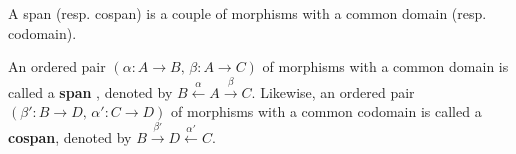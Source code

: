 A span (resp. cospan) is a couple of morphisms with a common domain (resp. codomain).
\begin{definition}
An ordered pair \((\alpha : A \to B,\, \beta : A \to C)\) of morphisms with a common domain is called a \textbf{span} \cite{lowe2010graph}, denoted by
\(
B \overset{\alpha}{\leftarrow} A \overset{\beta}{\rightarrow} C
\). 
Likewise, an ordered pair \((\beta' : B \to D,\, \alpha' : C \to D)\) of morphisms with a common codomain is called a \textbf{cospan}, denoted by
\(
B \overset{\beta'}{\rightarrow} D \overset{\alpha'}{\leftarrow} C
\). 
\end{definition}
